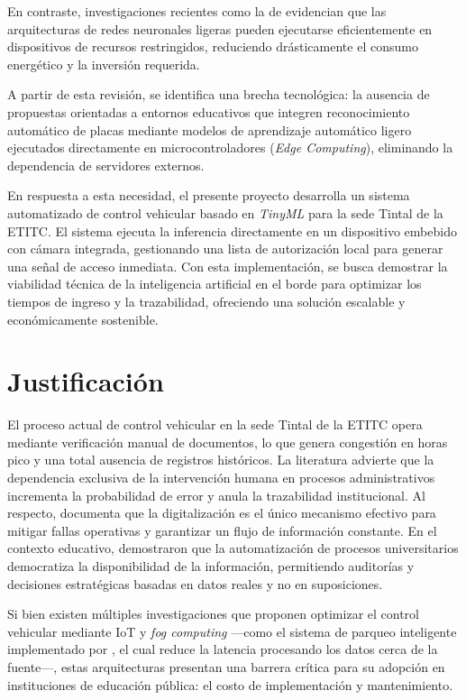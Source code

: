 \documentclass[12pt, letterpaper]{article}
\begin{document}
En contraste, investigaciones recientes como la de \textcite{zheng2025iot} evidencian que las arquitecturas de redes neuronales ligeras pueden ejecutarse eficientemente en dispositivos de recursos restringidos, reduciendo drásticamente el consumo energético y la inversión requerida. 

A partir de esta revisión, se identifica una brecha tecnológica: la ausencia de propuestas orientadas a entornos educativos que integren reconocimiento automático de placas mediante modelos de aprendizaje automático ligero ejecutados directamente en microcontroladores (\textit{Edge Computing}), eliminando la dependencia de servidores externos.

En respuesta a esta necesidad, el presente proyecto desarrolla un sistema automatizado de control vehicular basado en \textit{TinyML} para la sede Tintal de la ETITC. El sistema ejecuta la inferencia directamente en un dispositivo embebido con cámara integrada, gestionando una lista de autorización local para generar una señal de acceso inmediata. Con esta implementación, se busca demostrar la viabilidad técnica de la inteligencia artificial en el borde para optimizar los tiempos de ingreso y la trazabilidad, ofreciendo una solución escalable y económicamente sostenible.

\section{Justificación}

El proceso actual de control vehicular en la sede Tintal de la ETITC opera mediante verificación manual de documentos, lo que genera congestión en horas pico y una total ausencia de registros históricos. La literatura advierte que la dependencia exclusiva de la intervención humana en procesos administrativos incrementa la probabilidad de error y anula la trazabilidad institucional. Al respecto, \textcite{macias1996acceso} documenta que la digitalización es el único mecanismo efectivo para mitigar fallas operativas y garantizar un flujo de información constante. En el contexto educativo, \textcite{oloriz2022certificacion} demostraron que la automatización de procesos universitarios democratiza la disponibilidad de la información, permitiendo auditorías y decisiones estratégicas basadas en datos reales y no en suposiciones.

Si bien existen múltiples investigaciones que proponen optimizar el control vehicular mediante IoT y \textit{fog computing} —como el sistema de parqueo inteligente implementado por \textcite{celaya2020fog}, el cual reduce la latencia procesando los datos cerca de la fuente—, estas arquitecturas presentan una barrera crítica para su adopción en instituciones de educación pública: el costo de implementación y mantenimiento.
\end{document}
